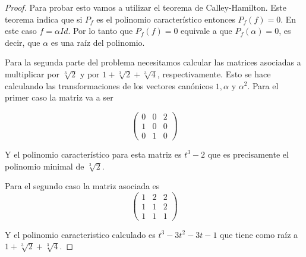 \documentclass[letter,twoside,12pt]{article}
\begin{document}
\begin{proof}
Para probar esto vamos a utilizar el teorema de Calley-Hamilton. Este teorema indica que si $ P_f $ es el polinomio característico entonces $ P_{f}(f) = 0 $. En este caso $ f = \alpha Id $. Por lo tanto que $ P_f(f)=0 $ equivale a que $ P_f(\alpha)=0 $, es decir, que $ \alpha $ es una raíz del polinomio.

Para la segunda parte del problema necesitamos calcular las matrices asociadas a multiplicar por $ \sqrt[3]{2} $ y por $ 1+\sqrt[3]{2}+\sqrt[3]{4} $, respectivamente. Esto se hace calculando las transformaciones de los vectores canónicos $ 1, \alpha $ y $ \alpha^2 $. Para el primer caso la matriz va a ser

 \begin{equation}
 \begin{pmatrix}
 0 & 0 & 2
 \\1 & 0 & 0
 \\ 0 & 1 & 0
 \end{pmatrix} \nonumber
 \end{equation}

Y el polinomio característico para esta matriz es $ t^3-2 $ que es precisamente el polinomio minimal de $ \sqrt[3]{2} $.

Para el segundo caso la matriz asociada es 
 \begin{equation}
 \begin{pmatrix}
 1 & 2 & 2
 \\1 & 1 & 2
 \\ 1 & 1 & 1
 \end{pmatrix} \nonumber
 \end{equation}
 
 Y el polinomio caracteristico calculado es $ t^3-3t^2-3t-1 $ que tiene como raíz a $ 1+\sqrt[3]{2}+\sqrt[3]{4} $.
\end{proof}
\end{document}
